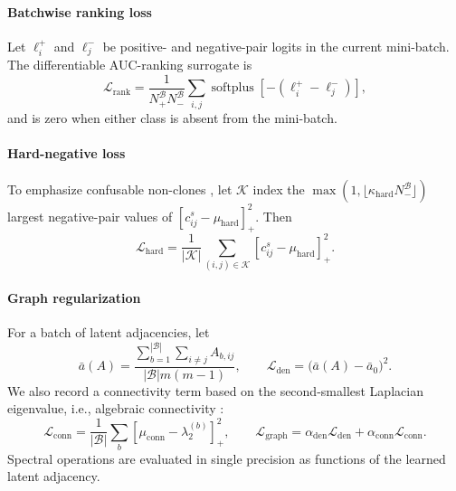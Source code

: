 \documentclass[final,5p,times,twocolumn]{elsarticle}
\newcommand{\relu}[1]{\left[#1\right]_{+}}
\theoremstyle{plain}
\begin{document}
\paragraph{Batchwise ranking loss}
Let $\ell_i^+$ and $\ell_j^-$ be positive- and negative-pair logits in the current mini-batch. The differentiable AUC-ranking surrogate is
\begin{equation}
\mathcal{L}_{\mathrm{rank}}
=
\frac{1}{N_+^{\mathcal B}N_-^{\mathcal B}}
\sum_{i,j}
\operatorname{softplus}\!\left[-(\ell_i^+-\ell_j^-)\right],
\label{eq:revised_auc_ranking}
\end{equation}
and is zero when either class is absent from the mini-batch.

\paragraph{Hard-negative loss} To emphasize confusable non-clones
\cite{wang2022disco}, let $\mathcal{K}$ index the
$\max(1,\lfloor\kappa_{\mathrm{hard}}N_-^{\mathcal{B}}\rfloor)$ largest negative-pair values of
$\relu{c^s_{ij}-\mu_{\mathrm{hard}}}^{2}$. Then
\begin{equation}
\mathcal{L}_{\mathrm{hard}}
=
\frac{1}{|\mathcal{K}|}
\sum_{(i,j)\in\mathcal{K}}
\relu{
c^s_{ij}-\mu_{\mathrm{hard}}
}^{2}.
\label{eq:revised_hard_negative}
\end{equation}

\paragraph{Graph regularization}
For a batch of latent adjacencies, let
\begin{equation}
\bar{a}(A)
=
\frac{
\sum_{b=1}^{|\mathcal{B}|}\sum_{i\neq j}A_{b,ij}
}{
|\mathcal{B}|m(m-1)
},
\qquad
\mathcal{L}_{\mathrm{den}}
=
\bigl(\bar{a}(A)-\bar{a}_0\bigr)^2.
\end{equation}
We also record a connectivity term based on the second-smallest Laplacian eigenvalue, i.e., algebraic connectivity \cite{fiedler1973algebraic}:
\begin{equation}
\mathcal{L}_{\mathrm{conn}}
=
\frac{1}{|\mathcal{B}|}
\sum_b
\relu{\mu_{\mathrm{conn}}-\lambda_2^{(b)}}^2,
\qquad
\mathcal{L}_{\mathrm{graph}}
=
\alpha_{\mathrm{den}}\mathcal{L}_{\mathrm{den}}
+
\alpha_{\mathrm{conn}}\mathcal{L}_{\mathrm{conn}}.
\label{eq:revised_graph_regularizer}
\end{equation}
Spectral operations are evaluated in single precision as functions of the learned latent adjacency.
\end{document}
